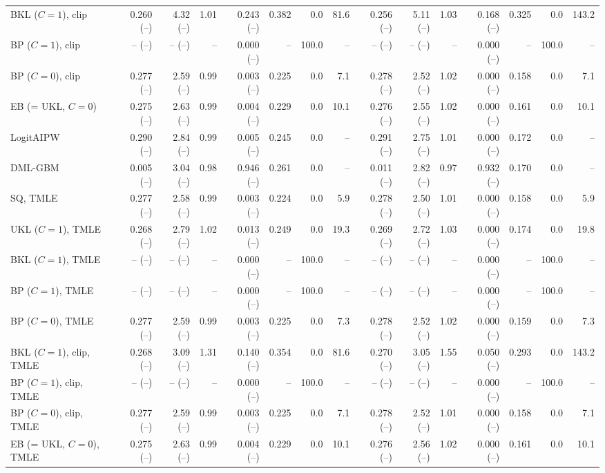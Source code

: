 \begin{tabular}{lrrrrrrrrrrrrrr}
BKL ($C=1$), clip & 0.260 (--) & 4.32 (--) & 1.01 & 0.243 (--) & 0.382 & 0.0 & 81.6 & 0.256 (--) & 5.11 (--) & 1.03 & 0.168 (--) & 0.325 & 0.0 & 143.2 \\
BP ($C=1$), clip & -- (--) & -- (--) & -- & 0.000 (--) & -- & 100.0 & -- & -- (--) & -- (--) & -- & 0.000 (--) & -- & 100.0 & -- \\
BP ($C=0$), clip & 0.277 (--) & 2.59 (--) & 0.99 & 0.003 (--) & 0.225 & 0.0 & 7.1 & 0.278 (--) & 2.52 (--) & 1.02 & 0.000 (--) & 0.158 & 0.0 & 7.1 \\
EB (= UKL, $C=0$) & 0.275 (--) & 2.63 (--) & 0.99 & 0.004 (--) & 0.229 & 0.0 & 10.1 & 0.276 (--) & 2.55 (--) & 1.02 & 0.000 (--) & 0.161 & 0.0 & 10.1 \\
LogitAIPW & 0.290 (--) & 2.84 (--) & 0.99 & 0.005 (--) & 0.245 & 0.0 & -- & 0.291 (--) & 2.75 (--) & 1.01 & 0.000 (--) & 0.172 & 0.0 & -- \\
DML-GBM & 0.005 (--) & 3.04 (--) & 0.98 & 0.946 (--) & 0.261 & 0.0 & -- & 0.011 (--) & 2.82 (--) & 0.97 & 0.932 (--) & 0.170 & 0.0 & -- \\
SQ, TMLE & 0.277 (--) & 2.58 (--) & 0.99 & 0.003 (--) & 0.224 & 0.0 & 5.9 & 0.278 (--) & 2.50 (--) & 1.01 & 0.000 (--) & 0.158 & 0.0 & 5.9 \\
UKL ($C=1$), TMLE & 0.268 (--) & 2.79 (--) & 1.02 & 0.013 (--) & 0.249 & 0.0 & 19.3 & 0.269 (--) & 2.72 (--) & 1.03 & 0.000 (--) & 0.174 & 0.0 & 19.8 \\
BKL ($C=1$), TMLE & -- (--) & -- (--) & -- & 0.000 (--) & -- & 100.0 & -- & -- (--) & -- (--) & -- & 0.000 (--) & -- & 100.0 & -- \\
BP ($C=1$), TMLE & -- (--) & -- (--) & -- & 0.000 (--) & -- & 100.0 & -- & -- (--) & -- (--) & -- & 0.000 (--) & -- & 100.0 & -- \\
BP ($C=0$), TMLE & 0.277 (--) & 2.59 (--) & 0.99 & 0.003 (--) & 0.225 & 0.0 & 7.3 & 0.278 (--) & 2.52 (--) & 1.02 & 0.000 (--) & 0.159 & 0.0 & 7.3 \\
BKL ($C=1$), clip, TMLE & 0.268 (--) & 3.09 (--) & 1.31 & 0.140 (--) & 0.354 & 0.0 & 81.6 & 0.270 (--) & 3.05 (--) & 1.55 & 0.050 (--) & 0.293 & 0.0 & 143.2 \\
BP ($C=1$), clip, TMLE & -- (--) & -- (--) & -- & 0.000 (--) & -- & 100.0 & -- & -- (--) & -- (--) & -- & 0.000 (--) & -- & 100.0 & -- \\
BP ($C=0$), clip, TMLE & 0.277 (--) & 2.59 (--) & 0.99 & 0.003 (--) & 0.225 & 0.0 & 7.1 & 0.278 (--) & 2.52 (--) & 1.01 & 0.000 (--) & 0.158 & 0.0 & 7.1 \\
EB (= UKL, $C=0$), TMLE & 0.275 (--) & 2.63 (--) & 0.99 & 0.004 (--) & 0.229 & 0.0 & 10.1 & 0.276 (--) & 2.56 (--) & 1.02 & 0.000 (--) & 0.161 & 0.0 & 10.1 \\
\hline
\end{tabular}
